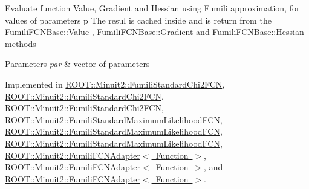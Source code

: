 Evaluate function Value, Gradient and Hessian using Fumili approximation, for values of parameters p The resul is cached inside and is return from the \mbox{\hyperlink{classROOT_1_1Minuit2_1_1FumiliFCNBase_a221dacee0ccde747a271a0cecd759f98}{Fumili\+F\+C\+N\+Base\+::\+Value}} , \mbox{\hyperlink{classROOT_1_1Minuit2_1_1FumiliFCNBase_ad226939ea2e83f754b5a6afc30876d3e}{Fumili\+F\+C\+N\+Base\+::\+Gradient}} and \mbox{\hyperlink{classROOT_1_1Minuit2_1_1FumiliFCNBase_ade134d8c6613393e942ef98d445db376}{Fumili\+F\+C\+N\+Base\+::\+Hessian}} methods


\begin{DoxyParams}{Parameters}
{\em par} & vector of parameters \\
\hline
\end{DoxyParams}


Implemented in \mbox{\hyperlink{classROOT_1_1Minuit2_1_1FumiliStandardChi2FCN_a76f42b6e5d2a92961a9fd8feca38b582}{R\+O\+O\+T\+::\+Minuit2\+::\+Fumili\+Standard\+Chi2\+F\+CN}}, \mbox{\hyperlink{classROOT_1_1Minuit2_1_1FumiliStandardChi2FCN_ace15dd1aad435e460c523bc37bff12a8}{R\+O\+O\+T\+::\+Minuit2\+::\+Fumili\+Standard\+Chi2\+F\+CN}}, \mbox{\hyperlink{classROOT_1_1Minuit2_1_1FumiliStandardChi2FCN_ace15dd1aad435e460c523bc37bff12a8}{R\+O\+O\+T\+::\+Minuit2\+::\+Fumili\+Standard\+Chi2\+F\+CN}}, \mbox{\hyperlink{classROOT_1_1Minuit2_1_1FumiliStandardMaximumLikelihoodFCN_a1faea776f7da3c238e522748b573caab}{R\+O\+O\+T\+::\+Minuit2\+::\+Fumili\+Standard\+Maximum\+Likelihood\+F\+CN}}, \mbox{\hyperlink{classROOT_1_1Minuit2_1_1FumiliStandardMaximumLikelihoodFCN_a37e72fc87092e5699066098fa5a31235}{R\+O\+O\+T\+::\+Minuit2\+::\+Fumili\+Standard\+Maximum\+Likelihood\+F\+CN}}, \mbox{\hyperlink{classROOT_1_1Minuit2_1_1FumiliStandardMaximumLikelihoodFCN_a37e72fc87092e5699066098fa5a31235}{R\+O\+O\+T\+::\+Minuit2\+::\+Fumili\+Standard\+Maximum\+Likelihood\+F\+CN}}, \mbox{\hyperlink{classROOT_1_1Minuit2_1_1FumiliFCNAdapter_a75bacae09c510900a45ea753afae971a}{R\+O\+O\+T\+::\+Minuit2\+::\+Fumili\+F\+C\+N\+Adapter$<$ Function $>$}}, \mbox{\hyperlink{classROOT_1_1Minuit2_1_1FumiliFCNAdapter_a75bacae09c510900a45ea753afae971a}{R\+O\+O\+T\+::\+Minuit2\+::\+Fumili\+F\+C\+N\+Adapter$<$ Function $>$}}, and \mbox{\hyperlink{classROOT_1_1Minuit2_1_1FumiliFCNAdapter_a75bacae09c510900a45ea753afae971a}{R\+O\+O\+T\+::\+Minuit2\+::\+Fumili\+F\+C\+N\+Adapter$<$ Function $>$}}.

\mbox{\label{classROOT_1_1Minuit2_1_1FumiliFCNBase_ad226939ea2e83f754b5a6afc30876d3e}} 
